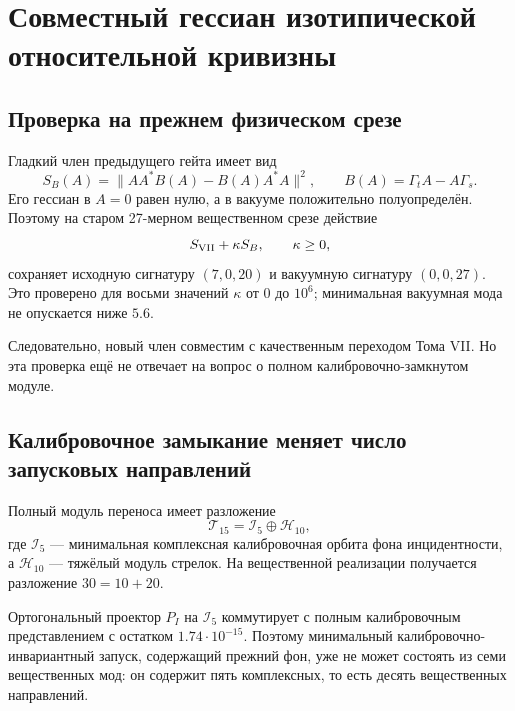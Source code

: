 \chapter{Совместный гессиан изотипической относительной кривизны}
\label{ch:v8-isotypic-relative-curvature-parent-hessian-gate}

\section{Проверка на прежнем физическом срезе}

Гладкий член предыдущего гейта имеет вид
\begin{equation}
 S_B(A)=\|AA^*B(A)-B(A)A^*A\|^2,
 \qquad
 B(A)=\Gamma_tA-A\Gamma_s.
 \label{eq:v8-isotypic-action-recall}
\end{equation}
Его гессиан в $A=0$ равен нулю, а в вакууме положительно
полуопределён. Поэтому на старом 27-мерном вещественном срезе действие
\begin{equation}
 S_{\rm VII}+\kappa S_B,
 \qquad \kappa\geq0,
 \label{eq:v8-old-slice-isotypic-extension}
\end{equation}
сохраняет исходную сигнатуру $(7,0,20)$ и вакуумную сигнатуру $(0,0,27)$.
Это проверено для восьми значений $\kappa$ от $0$ до $10^6$; минимальная
вакуумная мода не опускается ниже $5.6$.

Следовательно, новый член совместим с качественным переходом Тома VII. Но
эта проверка ещё не отвечает на вопрос о полном калибровочно-замкнутом модуле.

\section{Калибровочное замыкание меняет число запусковых направлений}

Полный модуль переноса имеет разложение
\begin{equation}
 \mathcal T_{15}=\mathcal I_5\oplus\mathcal H_{10},
 \label{eq:v8-incidence-heavy-complex-splitting}
\end{equation}
где $\mathcal I_5$ --- минимальная комплексная калибровочная орбита фона инцидентности,
а $\mathcal H_{10}$ --- тяжёлый модуль стрелок. На вещественной реализации
получается разложение $30=10+20$.

Ортогональный проектор $P_I$ на $\mathcal I_5$ коммутирует с полным
калибровочным представлением с остатком $1.74\cdot10^{-15}$. Поэтому минимальный
калибровочно-инвариантный запуск, содержащий прежний фон, уже не может состоять из
семи вещественных мод: он содержит пять комплексных, то есть десять
вещественных направлений.

